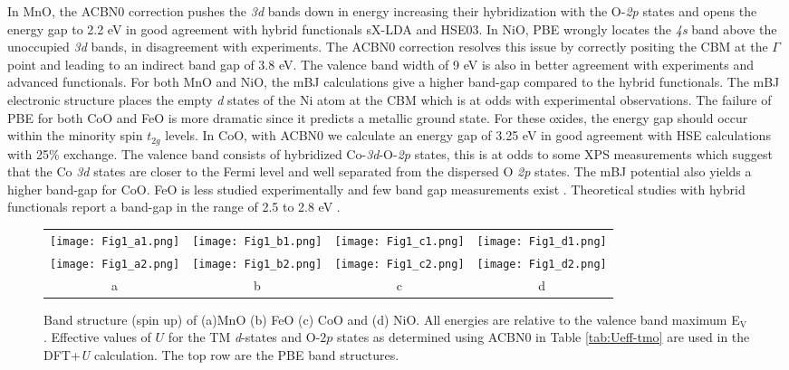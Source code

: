 \documentclass[12pt,a4paper,final]{iopart}
\begin{document}
In MnO, the ACBN0 correction pushes the \textit{3d} bands down in energy increasing their hybridization with the O-\textit{2p} states and opens the energy gap to 2.2 eV in good agreement with  hybrid functionals sX-LDA and HSE03. In NiO, PBE wrongly locates the \textit{4s} band above the unoccupied \textit{3d} bands, in disagreement with experiments\cite{li2005quasiparticle}.
The ACBN0 correction resolves this issue by correctly positing the CBM  at the $\Gamma$ point and leading to an indirect band gap of 3.8 eV.  The valence band width of 9 eV is  also in better agreement with experiments \cite{li2005quasiparticle} and advanced functionals. 
For both MnO and NiO, the mBJ calculations give a higher band-gap compared to the hybrid functionals. The mBJ electronic structure places the empty \textit{d} states of the Ni atom at the CBM which is at odds with experimental observations. 
The failure of PBE for both CoO and FeO is more dramatic since it predicts a metallic ground state. For these oxides, the energy gap should occur within the minority spin $t_{2g}$ levels. In CoO, with ACBN0 we calculate an energy gap of 3.25 eV in good  agreement with HSE calculations   with 25\% exchange. The valence band consists of  hybridized Co-\textit{3d}-O-\textit{2p} states, this is at odds to some XPS measurements \cite{qiao2013nature} which suggest that the Co \textit{3d} states are closer to the Fermi level and well separated from the dispersed O \textit{2p} states. The mBJ potential also yields a higher band-gap for CoO. 
FeO is less studied experimentally and few band gap measurements exist \cite{bowen1975electrical}. Theoretical studies with hybrid functionals  report a band-gap in the range of 2.5 to 2.8 eV \cite{heyd2003hybrid,aryasetiawan1998gw}.
 
\begin{figure*}[htb!]
\centering
\captionsetup{width=\linewidth}
\begin{tabular}{cccc}
\texttt{[image: Fig1\_a1.png]} &  \texttt{[image: Fig1\_b1.png]} & \texttt{[image: Fig1\_c1.png]} & \texttt{[image: Fig1\_d1.png]} \\

\texttt{[image: Fig1\_a2.png]} &  \texttt{[image: Fig1\_b2.png]} & \texttt{[image: Fig1\_c2.png]} & \texttt{[image: Fig1\_d2.png]} \\
a & b & c & d \\
\end{tabular}
\caption{\small{Band structure (spin up) of (a)MnO (b) FeO (c) CoO and (d) NiO. All energies are relative to the valence band maximum E$_\textrm{V}$. Effective values of $U$ for the TM \textit{d}-states and {O-$2p$} states as determined using ACBN0 in Table \ref{tab:Ueff-tmo} are used in the DFT+\textit{U} calculation. The top row are the PBE band structures.}}
\label{fig:TMO-band}
\end{figure*}
\end{document}
